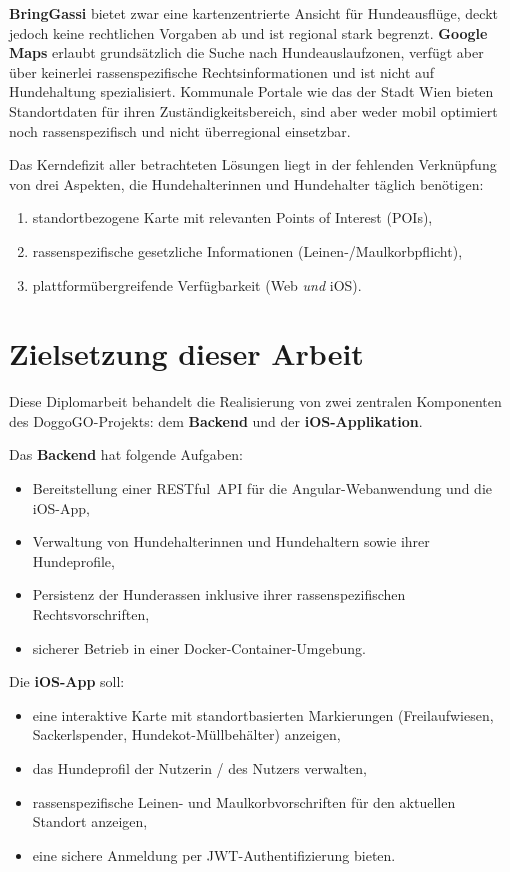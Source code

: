 \textbf{BringGassi} bietet zwar eine kartenzentrierte Ansicht für Hundeausflüge, deckt
jedoch keine rechtlichen Vorgaben ab und ist regional stark begrenzt. \textbf{Google Maps}
erlaubt grundsätzlich die Suche nach Hundeauslaufzonen, verfügt aber über keinerlei
rassenspezifische Rechtsinformationen und ist nicht auf Hundehaltung spezialisiert. Kommunale
Portale wie das der Stadt Wien bieten Standortdaten für ihren Zuständigkeitsbereich, sind
aber weder mobil optimiert noch rassenspezifisch und nicht überregional einsetzbar.

Das Kerndefizit aller betrachteten Lösungen liegt in der fehlenden Verknüpfung von drei
Aspekten, die Hundehalter\-innen und Hundehalter täglich benötigen:
\begin{enumerate}
  \item standortbezogene Karte mit relevanten Points of Interest (POIs),
  \item rassenspezifische gesetzliche Informationen (Leinen-/Maulkorbpflicht),
  \item plattformübergreifende Verfügbarkeit (Web \emph{und} iOS).
\end{enumerate}

\section{Zielsetzung dieser Arbeit}
\label{sec:zielsetzung}

Diese Diplomarbeit behandelt die Realisierung von zwei zentralen Komponenten des
DoggoGO-Projekts: dem \textbf{Backend} und der \textbf{iOS-Applikation}.

Das \textbf{Backend} hat folgende Aufgaben:
\begin{itemize}
  \item Bereitstellung einer RESTful~API für die Angular-Webanwendung und die iOS-App,
  \item Verwaltung von Hundehalter\-innen und Hundehaltern sowie ihrer Hundeprofile,
  \item Persistenz der Hunderassen inklusive ihrer rassenspezifischen Rechtsvorschriften,
  \item sicherer Betrieb in einer Docker-Container-Umgebung.
\end{itemize}

Die \textbf{iOS-App} soll:
\begin{itemize}
  \item eine interaktive Karte mit standortbasierten Markierungen (Freilaufwiesen,
        Sackerlspender, Hundekot-Müllbehälter) anzeigen,
  \item das Hundeprofil der Nutzerin / des Nutzers verwalten,
  \item rassenspezifische Leinen- und Maulkorbvorschriften für den aktuellen Standort anzeigen,
  \item eine sichere Anmeldung per JWT-Authentifizierung bieten.
\end{itemize}

